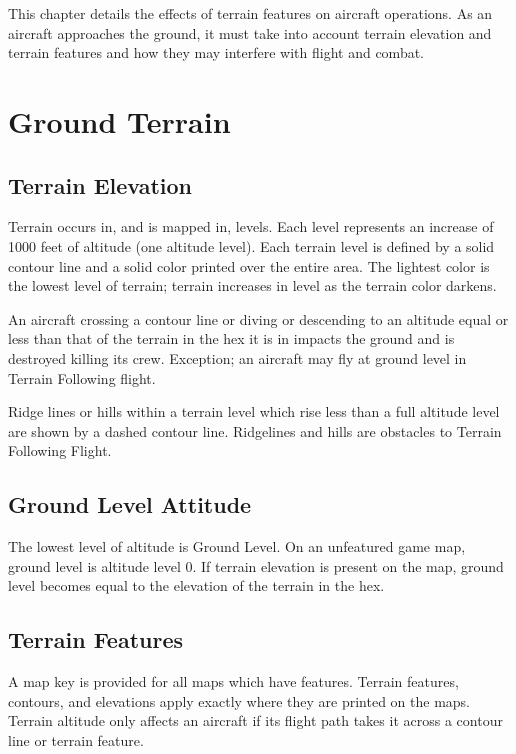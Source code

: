 

This chapter details the effects of terrain features on aircraft operations. As an aircraft approaches the ground, it must take into account terrain elevation and terrain features and how they may interfere with flight and combat.

\section{Ground Terrain}
\label{rule:ground-terrain}

\subsection{Terrain Elevation} Terrain occurs in, and is mapped in, levels. Each level represents an increase of 1000 feet of altitude (one altitude level). Each terrain level is defined by a solid contour line and a solid color printed over the entire area. The lightest color is the lowest level of terrain; terrain increases in level as the terrain color darkens.

An aircraft crossing a contour line or diving or descending to an altitude equal or less than that of the terrain in the hex it is in impacts the ground and is destroyed killing its crew. Exception; an aircraft may fly at ground level in Terrain Following flight.

Ridge lines or hills within a terrain level which rise less than a full altitude level are shown by a dashed contour line. Ridgelines and hills are obstacles to Terrain Following Flight.

\subsection{Ground Level Attitude} The lowest level of altitude is Ground Level. On an unfeatured game map, ground level is altitude level 0. If terrain elevation is present on the map, ground level becomes equal to the elevation of the terrain in the hex.

\subsection{Terrain Features} A map key is provided for all maps which have features. Terrain features, contours, and elevations apply exactly where they are printed on the maps. Terrain altitude only affects an aircraft if its flight path takes it across a contour line or terrain feature.

